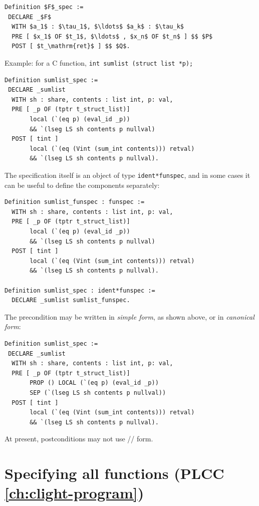 \documentclass[12pt,fleqn,openany,oneside,showtrims]{memoir}
\newcommand{\ychapter}[2]{\chapter[#1]{#1 \hfill \normalsize #2}}
\begin{document}
\begin{lstlisting}
Definition $F$_spec :=
 DECLARE _$F$
  WITH $a_1$ : $\tau_1$, $\ldots$ $a_k$ : $\tau_k$
  PRE [ $x_1$ OF $t_1$, $\ldots$ , $x_n$ OF $t_n$ ] $$ $P$
  POST [ $t_\mathrm{ret}$ ] $$ $Q$.
\end{lstlisting}

Example: for a C function, \lstinline{int sumlist (struct list *p);}

\begin{lstlisting}
Definition sumlist_spec :=
 DECLARE _sumlist
  WITH sh : share, contents : list int, p: val,
  PRE [ _p OF (tptr t_struct_list)]  
       local (`(eq p) (eval_id _p))
       && `(lseg LS sh contents p nullval)
  POST [ tint ]  
       local (`(eq (Vint (sum_int contents))) retval)
       && `(lseg LS sh contents p nullval).
\end{lstlisting}

The specification itself is an object of type \lstinline{ident*funspec},
and in some cases it can be useful to define the components
separately:

\begin{lstlisting}
Definition sumlist_funspec : funspec :=
  WITH sh : share, contents : list int, p: val,
  PRE [ _p OF (tptr t_struct_list)]  
       local (`(eq p) (eval_id _p))
       && `(lseg LS sh contents p nullval)
  POST [ tint ]  
       local (`(eq (Vint (sum_int contents))) retval)
       && `(lseg LS sh contents p nullval).

Definition sumlist_spec : ident*funspec :=
  DECLARE _sumlist sumlist_funspec.
\end{lstlisting}

The precondition may be written in 
\emph{simple form}, as shown above, or in \emph{canonical form}:

\begin{lstlisting}
Definition sumlist_spec :=
 DECLARE _sumlist
  WITH sh : share, contents : list int, p: val,
  PRE [ _p OF (tptr t_struct_list)]  
       PROP () LOCAL (`(eq p) (eval_id _p)) 
       SEP (`(lseg LS sh contents p nullval))
  POST [ tint ]  
       local (`(eq (Vint (sum_int contents))) retval)
       && `(lseg LS sh contents p nullval).
\end{lstlisting}

At present, postconditions may not use \PROP/\LOCAL/\SEP{} form.

\ychapter{Specifying all functions}{\hspace{-.4in}(PLCC \autoref{ch:clight-program})}
\end{document}

